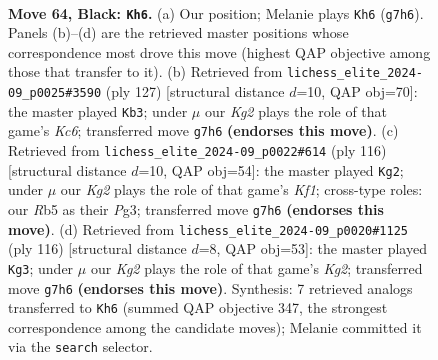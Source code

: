 \documentclass[11pt]{article}
\begin{document}
\clearpage

\begin{figure}[p]\centering
\begin{subfigure}{0.46\textwidth}\centering
\resizebox{\linewidth}{!}{%
\newchessgame
\chessboard[
  setfen={8/2R3k1/8/pr6/5K2/1P6/7P/3r4 b - - 3 64},
  showmover=false,
  pgfstyle=straightmove, color=movearrow, markmove={g7-h6}
]}
\caption{}
\end{subfigure}\hfill
\begin{subfigure}{0.46\textwidth}\centering
\resizebox{\linewidth}{!}{%
\newchessgame
\chessboard[
  setfen={8/2R5/8/5rp1/8/2k2PK1/8/8 b - - 14 64},
  showmover=false,
  pgfstyle=straightmove, color=movearrow, markmove={c3-b3}
]}
\caption{}
\end{subfigure}
\\[4pt]
\begin{subfigure}{0.46\textwidth}\centering
\resizebox{\linewidth}{!}{%
\newchessgame
\chessboard[
  setfen={8/8/4k1p1/8/1R3Pp1/6P1/8/r4K2 w - - 21 59},
  showmover=false,
  pgfstyle=straightmove, color=movearrow, markmove={f1-g2}
]}
\caption{}
\end{subfigure}\hfill
\begin{subfigure}{0.46\textwidth}\centering
\resizebox{\linewidth}{!}{%
\newchessgame
\chessboard[
  setfen={8/P7/2k5/8/R5p1/8/1r4K1/8 w - - 1 59},
  showmover=false,
  pgfstyle=straightmove, color=movearrow, markmove={g2-g3}
]}
\caption{}
\end{subfigure}
\caption{\textbf{Move 64, Black: \texttt{Kh6}.} (a) Our position; Melanie plays \texttt{Kh6} (\texttt{g7h6}). Panels (b)--(d) are the retrieved master positions whose correspondence most drove this move (highest QAP objective among those that transfer to it). (b) Retrieved from \texttt{lichess\_elite\_2024-09\_p0025\#3590} (ply 127) [structural distance $d$=10, QAP obj=70]: the master played \texttt{Kb3}; under $\mu$ our \emph{Kg2} plays the role of that game's \emph{Kc6}; transferred move \texttt{g7h6} \textbf{(endorses this move)}. (c) Retrieved from \texttt{lichess\_elite\_2024-09\_p0022\#614} (ply 116) [structural distance $d$=10, QAP obj=54]: the master played \texttt{Kg2}; under $\mu$ our \emph{Kg2} plays the role of that game's \emph{Kf1}; cross-type roles: our \emph{R}b5 as their \emph{P}g3; transferred move \texttt{g7h6} \textbf{(endorses this move)}. (d) Retrieved from \texttt{lichess\_elite\_2024-09\_p0020\#1125} (ply 116) [structural distance $d$=8, QAP obj=53]: the master played \texttt{Kg3}; under $\mu$ our \emph{Kg2} plays the role of that game's \emph{Kg2}; transferred move \texttt{g7h6} \textbf{(endorses this move)}. Synthesis: 7 retrieved analogs transferred to \texttt{Kh6} (summed QAP objective 347, the strongest correspondence among the candidate moves); Melanie committed it via the \texttt{search} selector.}
\label{fig:thought-m127}
\end{figure}
\end{document}
